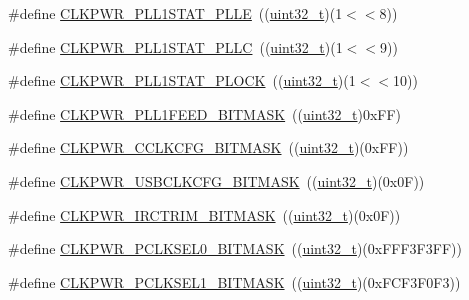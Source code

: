 \begin{DoxyCompactItemize}
\item 
\#define \hyperlink{group___c_l_k_p_w_r___private___macros_ga270320c2473b6f0d3f1ea503474db553}{C\+L\+K\+P\+W\+R\+\_\+\+P\+L\+L1\+S\+T\+A\+T\+\_\+\+P\+L\+LE}~((\hyperlink{_p_e___types_8h_a33594304e786b158f3fb30289278f5af}{uint32\+\_\+t})(1$<$$<$8))
\item 
\#define \hyperlink{group___c_l_k_p_w_r___private___macros_gaf342b31524d6db2bebef9f13fd82bcb4}{C\+L\+K\+P\+W\+R\+\_\+\+P\+L\+L1\+S\+T\+A\+T\+\_\+\+P\+L\+LC}~((\hyperlink{_p_e___types_8h_a33594304e786b158f3fb30289278f5af}{uint32\+\_\+t})(1$<$$<$9))
\item 
\#define \hyperlink{group___c_l_k_p_w_r___private___macros_ga01ad0b987dacc8c87a2453e8d6a2bcef}{C\+L\+K\+P\+W\+R\+\_\+\+P\+L\+L1\+S\+T\+A\+T\+\_\+\+P\+L\+O\+CK}~((\hyperlink{_p_e___types_8h_a33594304e786b158f3fb30289278f5af}{uint32\+\_\+t})(1$<$$<$10))
\item 
\#define \hyperlink{group___c_l_k_p_w_r___private___macros_ga9a447d2223491de7202909fc868cf488}{C\+L\+K\+P\+W\+R\+\_\+\+P\+L\+L1\+F\+E\+E\+D\+\_\+\+B\+I\+T\+M\+A\+SK}~((\hyperlink{_p_e___types_8h_a33594304e786b158f3fb30289278f5af}{uint32\+\_\+t})0x\+F\+F)
\item 
\#define \hyperlink{group___c_l_k_p_w_r___private___macros_ga0ab96470807340781971aed85a29c68f}{C\+L\+K\+P\+W\+R\+\_\+\+C\+C\+L\+K\+C\+F\+G\+\_\+\+B\+I\+T\+M\+A\+SK}~((\hyperlink{_p_e___types_8h_a33594304e786b158f3fb30289278f5af}{uint32\+\_\+t})(0x\+F\+F))
\item 
\#define \hyperlink{group___c_l_k_p_w_r___private___macros_ga12d7d89e728855b19604a2269defe745}{C\+L\+K\+P\+W\+R\+\_\+\+U\+S\+B\+C\+L\+K\+C\+F\+G\+\_\+\+B\+I\+T\+M\+A\+SK}~((\hyperlink{_p_e___types_8h_a33594304e786b158f3fb30289278f5af}{uint32\+\_\+t})(0x0\+F))
\item 
\#define \hyperlink{group___c_l_k_p_w_r___private___macros_gaaadc4b00f71d11437fe42e5c7370f003}{C\+L\+K\+P\+W\+R\+\_\+\+I\+R\+C\+T\+R\+I\+M\+\_\+\+B\+I\+T\+M\+A\+SK}~((\hyperlink{_p_e___types_8h_a33594304e786b158f3fb30289278f5af}{uint32\+\_\+t})(0x0\+F))
\item 
\#define \hyperlink{group___c_l_k_p_w_r___private___macros_ga23565aaa7e0cebbc103288fe4128327f}{C\+L\+K\+P\+W\+R\+\_\+\+P\+C\+L\+K\+S\+E\+L0\+\_\+\+B\+I\+T\+M\+A\+SK}~((\hyperlink{_p_e___types_8h_a33594304e786b158f3fb30289278f5af}{uint32\+\_\+t})(0x\+F\+F\+F3\+F3\+F\+F))
\item 
\#define \hyperlink{group___c_l_k_p_w_r___private___macros_ga014d526b5a227f007ada460560dbcf48}{C\+L\+K\+P\+W\+R\+\_\+\+P\+C\+L\+K\+S\+E\+L1\+\_\+\+B\+I\+T\+M\+A\+SK}~((\hyperlink{_p_e___types_8h_a33594304e786b158f3fb30289278f5af}{uint32\+\_\+t})(0x\+F\+C\+F3\+F0\+F3))
$$
\end{DoxyCompactItemize}
